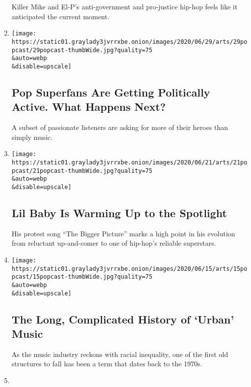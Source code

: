 \begin{enumerate}
  Killer Mike and El-P's anti-government and pro-justice hip-hop feels
  like it anticipated the current moment.
\item
  \href{/2020/06/30/arts/music/popcast-superfans-politics.html}{}

  \texttt{[image: https://static01.graylady3jvrrxbe.onion/images/2020/06/29/arts/29popcast/29popcast-thumbWide.jpg?quality=75\\\&auto=webp\\\&disable=upscale]}

  \hypertarget{pop-superfans-are-getting-politically-active-what-happens-next}{%
  \subsection{Pop Superfans Are Getting Politically Active. What Happens
  Next?}\label{pop-superfans-are-getting-politically-active-what-happens-next}}

  A subset of passionate listeners are asking for more of their heroes
  than simply music.
\item
  \href{/2020/06/21/arts/music/popcast-lil-baby.html}{}

  \texttt{[image: https://static01.graylady3jvrrxbe.onion/images/2020/06/21/arts/21popcast/21popcast-thumbWide.jpg?quality=75\\\&auto=webp\\\&disable=upscale]}

  \hypertarget{lil-baby-is-warming-up-to-the-spotlight}{%
  \subsection{Lil Baby Is Warming Up to the
  Spotlight}\label{lil-baby-is-warming-up-to-the-spotlight}}

  His protest song ``The Bigger Picture'' marks a high point in his
  evolution from reluctant up-and-comer to one of hip-hop's reliable
  superstars.
\item
  \href{/2020/06/15/arts/music/popcast-urban-music.html}{}

  \texttt{[image: https://static01.graylady3jvrrxbe.onion/images/2020/06/15/arts/15popcast/15popcast-thumbWide.jpg?quality=75\\\&auto=webp\\\&disable=upscale]}

  \hypertarget{the-long-complicated-history-of-urban-music}{%
  \subsection{The Long, Complicated History of `Urban'
  Music}\label{the-long-complicated-history-of-urban-music}}

  As the music industry reckons with racial inequality, one of the first
  old structures to fall has been a term that dates back to the 1970s.
\item
  \href{/2020/06/07/arts/music/popcast-the-source-rodney-king.html}{}


\end{enumerate}
